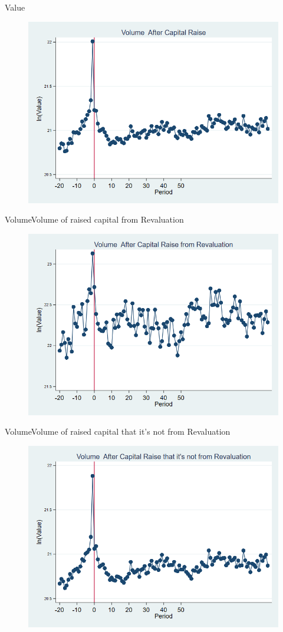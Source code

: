 \documentclass{beamer}
\begin{document}
	\begin{frame}{Value}
		\begin{figure}
			\centering
			\includegraphics[width=0.7\linewidth]{Output/volume.png}
			\label{fig:volume}
		\end{figure}
	\end{frame}
	
	
	\begin{frame}{Volume}{Volume of raised capital from Revaluation}
		\begin{figure}
			\centering
			\includegraphics[width=0.7\linewidth]{Output/volume_Revaluation.png}
			\label{fig:volumerevaluation}
		\end{figure}
	\end{frame}
	
	
	\begin{frame}{Volume}{Volume of raised capital that it's not from Revaluation}
		\begin{figure}
			\centering
			\includegraphics[width=0.7\linewidth]{Output/volume_NoRevaluation.png}
			\label{fig:volumenorevaluation}
		\end{figure}
	\end{frame}
	
\end{document}
